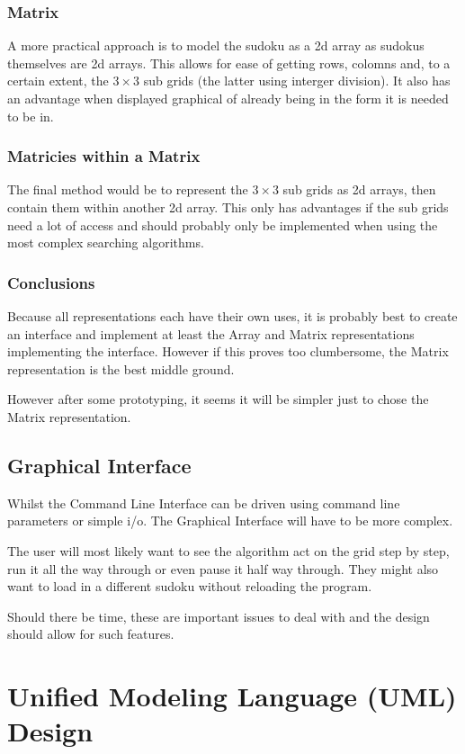 \documentclass[10pt,letterpaper]{article}
\begin{document}
	\subsubsection{Matrix}
	  A more practical approach is to model the sudoku as a 2d array as sudokus themselves are 2d arrays. This allows for ease of getting rows, colomns and, to a certain extent, the \(3\times 3\) sub grids (the latter using interger division). It also has an advantage when displayed graphical of already being in the form it is needed to be in.
	
	\subsubsection{Matricies within a Matrix}
	  The final method would be to represent the \(3\times 3\) sub grids as 2d arrays, then contain them within another 2d array. This only has advantages if the sub grids need a lot of access and should probably only be implemented when using the most complex searching algorithms.
	  
	\subsubsection{Conclusions}
	  Because all representations each have their own uses, it is probably best to create an interface and implement at least the Array and Matrix representations implementing the interface. However if this proves too clumbersome, the Matrix representation is the best middle ground.
	  
	  However after some prototyping, it seems it will be simpler just to chose the Matrix representation.
	  
      \subsection{Graphical Interface}
	Whilst the Command Line Interface can be driven using command line parameters or simple i/o. The Graphical Interface will have to be more complex.
	
	The user will most likely want to see the algorithm act on the grid step by step, run it all the way through or even pause it half way through. They might also want to load in a different sudoku without reloading the program.
	
	Should there be time, these are important issues to deal with and the design should allow for such features.
  
    \section{Unified Modeling Language (UML) Design}
\end{document}
